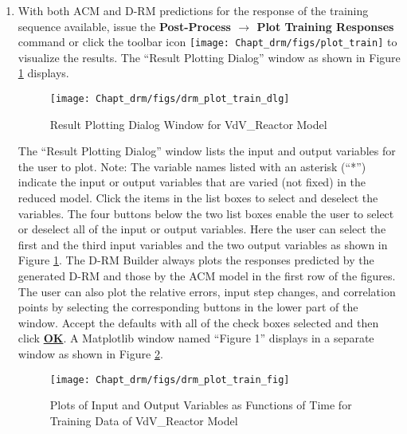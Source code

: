 \begin{enumerate}
	\item With both ACM and D-RM predictions for the response of the training sequence available, issue the \textbf{Post-Process $\rightarrow$ Plot Training Responses} command or click the toolbar icon \texttt{[image: Chapt\_drm/figs/plot\_train]} to visualize the results.  The ``Result Plotting Dialog'' window as shown in Figure \ref{fig.drm_plot_train_dlg} displays.
	\begin{figure}[H]
		\begin{center}
			\texttt{[image: Chapt\_drm/figs/drm\_plot\_train\_dlg]}
			\caption{Result Plotting Dialog Window for VdV\_Reactor Model}
			\label{fig.drm_plot_train_dlg}
		\end{center}
	\end{figure}
	The ``Result Plotting Dialog'' window lists the input and output variables for the user to plot.  Note: The variable names listed with an asterisk (``*'') indicate the input or output variables that are varied (not fixed) in the reduced model.  Click the items in the list boxes to select and deselect the variables.  The four buttons below the two list boxes enable the user to select or deselect all of the input or output variables.  Here the user can select the first and the third input variables and the two output variables as shown in Figure \ref{fig.drm_plot_train_dlg}.  The D-RM Builder always plots the responses predicted by the generated D-RM and those by the ACM model in the first row of the figures.  The user can also plot the relative errors, input step changes, and correlation points by selecting the corresponding buttons in the lower part of the window.  Accept the defaults with all of the check boxes selected and then click \textbf{\underline{OK}}.  A Matplotlib window named ``Figure 1'' displays in a separate window as shown in Figure \ref{fig.drm_plot_train_fig}.
	\begin{figure}[H]
		\begin{center}
			\texttt{[image: Chapt\_drm/figs/drm\_plot\_train\_fig]}
			\caption{Plots of Input and Output Variables as Functions of Time for Training Data of VdV\_Reactor Model}
			\label{fig.drm_plot_train_fig}
		\end{center}
	\end{figure}

\end{enumerate}
